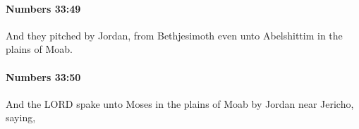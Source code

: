 		\paragraph{Numbers 33:49} %
			\label{NUMBERS-33-49}

			And they pitched by Jordan, from Bethjesimoth even unto Abelshittim in the plains of Moab.


		\paragraph{Numbers 33:50} %
			\label{NUMBERS-33-50}

			And the LORD spake unto Moses in the plains of Moab by Jordan near Jericho, saying,


